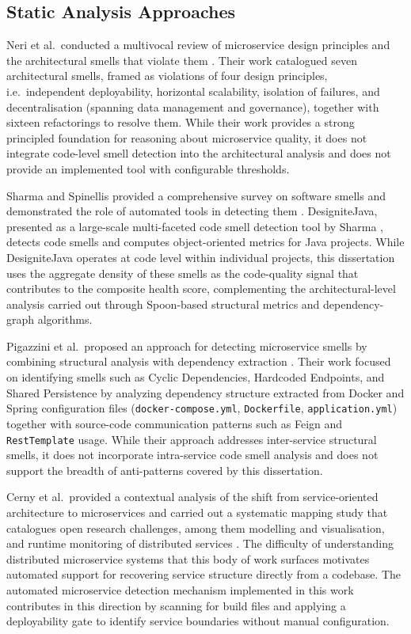 \subsection{Static Analysis Approaches}
\label{subsec:related-static}

\par Neri et al.\ conducted a multivocal review of microservice design principles and the architectural smells that violate them \cite{Neri2020}. Their work catalogued seven architectural smells, framed as violations of four design principles, i.e.\ independent deployability, horizontal scalability, isolation of failures, and decentralisation (spanning data management and governance), together with sixteen refactorings to resolve them. While their work provides a strong principled foundation for reasoning about microservice quality, it does not integrate code-level smell detection into the architectural analysis and does not provide an implemented tool with configurable thresholds.

Sharma and Spinellis provided a comprehensive survey on software smells and demonstrated the role of automated tools in detecting them \cite{Sharma2018}. DesigniteJava, presented as a large-scale multi-faceted code smell detection tool by Sharma \cite{Sharma2024}, detects code smells and computes object-oriented metrics for Java projects. While DesigniteJava operates at code level within individual projects, this dissertation uses the aggregate density of these smells as the code-quality signal that contributes to the composite health score, complementing the architectural-level analysis carried out through Spoon-based structural metrics and dependency-graph algorithms.

Pigazzini et al.\ proposed an approach for detecting microservice smells by combining structural analysis with dependency extraction \cite{Pigazzini2020}. Their work focused on identifying smells such as Cyclic Dependencies, Hardcoded Endpoints, and Shared Persistence by analyzing dependency structure extracted from Docker and Spring configuration files (\texttt{docker-compose.yml}, \texttt{Dockerfile}, \texttt{app\-lica\-tion\-.yml}) together with source-code communication patterns such as Feign and \texttt{RestTemplate} usage. While their approach addresses inter-service structural smells, it does not incorporate intra-service code smell analysis and does not support the breadth of anti-patterns covered by this dissertation.

Cerny et al.\ provided a contextual analysis of the shift from service-oriented architecture to microservices and carried out a systematic mapping study that catalogues open research challenges, among them modelling and visualisation, and runtime monitoring of distributed services \cite{Cerny2018}. The difficulty of understanding distributed microservice systems that this body of work surfaces motivates automated support for recovering service structure directly from a codebase. The automated microservice detection mechanism implemented in this work contributes in this direction by scanning for build files and applying a deployability gate to identify service boundaries without manual configuration.


